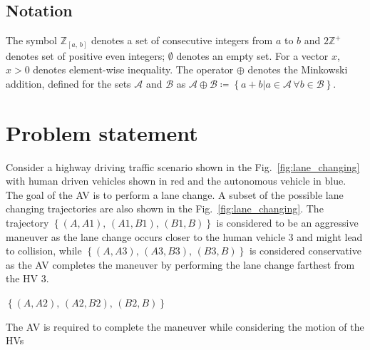 \documentclass[10pt,journal]{IEEEtran}
\begin{document}


	
	\subsection{Notation}
	The symbol $\mathbb{Z}_{\left[a,\, b\right]}$ denotes a set of consecutive integers from $a$ to $b$ and $2\mathbb{Z}^{+}$ denotes set of positive even integers; $\emptyset$ denotes an empty set. For a vector $x$, $x>0$ denotes element-wise inequality. The operator $\oplus$ denotes the Minkowski addition, defined for the sets $\mathcal{A}$ and $\mathcal{B}$ as $	\mathcal{A}\oplus\mathcal{B}\coloneqq\left\{ a+b | a\in\mathcal{A}\,\forall b\in\mathcal{B}\right\}$.
	


	

	\section{Problem statement}
	\label{sec:problem_statement}

	Consider a highway driving traffic scenario shown in the Fig.~\ref{fig:lane_changing} with human driven vehicles shown in red and the autonomous vehicle in blue. The goal of the AV is to perform a lane change. A subset of the possible lane changing trajectories are also shown in the Fig.~\ref{fig:lane_changing}. The trajectory $\left\{\left(A,A1\right),\,\left(A1,B1\right),\,\left(B1,B\right)\right\}$ is considered to be an aggressive maneuver as the lane change occurs closer to the human vehicle $3$ and might lead to collision, while $\left\{\left(A,A3\right),\,\left(A3,B3\right),\,\left(B3,B\right)\right\}$ is considered conservative as the AV completes the maneuver by performing the lane change farthest from the HV 3.
	
	$\left\{\left(A,A2\right),\,\left(A2,B2\right),\,\left(B2,B\right)\right\}$ 
	
	The AV is required to complete the maneuver while considering the motion of the HVs 
\end{document}
